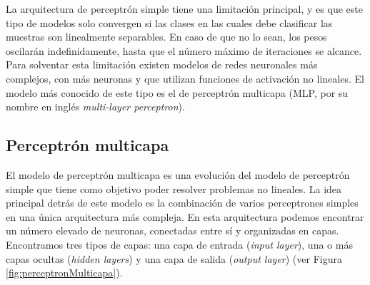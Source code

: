 \documentclass[11pt,spanish,listoffigures,listoftables]{tfgetsinf}
\begin{document}
La arquitectura de perceptrón simple tiene una limitación principal, y es que este tipo de modelos solo convergen si las clases en las cuales debe clasificar las muestras son linealmente separables. En caso de que no lo sean, los pesos oscilarán indefinidamente, hasta que el número máximo de iteraciones se alcance. Para solventar esta limitación existen modelos de redes neuronales más complejos, con más neuronas y que utilizan funciones de activación no lineales. El modelo más conocido de este tipo es el de perceptrón multicapa (MLP, por su nombre en inglés \textit{multi-layer perceptron}).

\subsection{Perceptrón multicapa} \label{perceptronmulticapa}

El modelo de perceptrón multicapa es una evolución del modelo de perceptrón simple que tiene como objetivo poder resolver problemas no lineales. La idea principal detrás de este modelo es la combinación de varios perceptrones simples en una única arquitectura más compleja. En esta arquitectura podemos encontrar un número elevado de neuronas, conectadas entre sí y organizadas en capas. Encontramos tres tipos de capas: una capa de entrada (\textit{input layer}), una o más capas ocultas (\textit{hidden layers}) y una capa de salida (\textit{output layer}) (ver Figura \ref{fig:perceptronMulticapa}).
\end{document}
